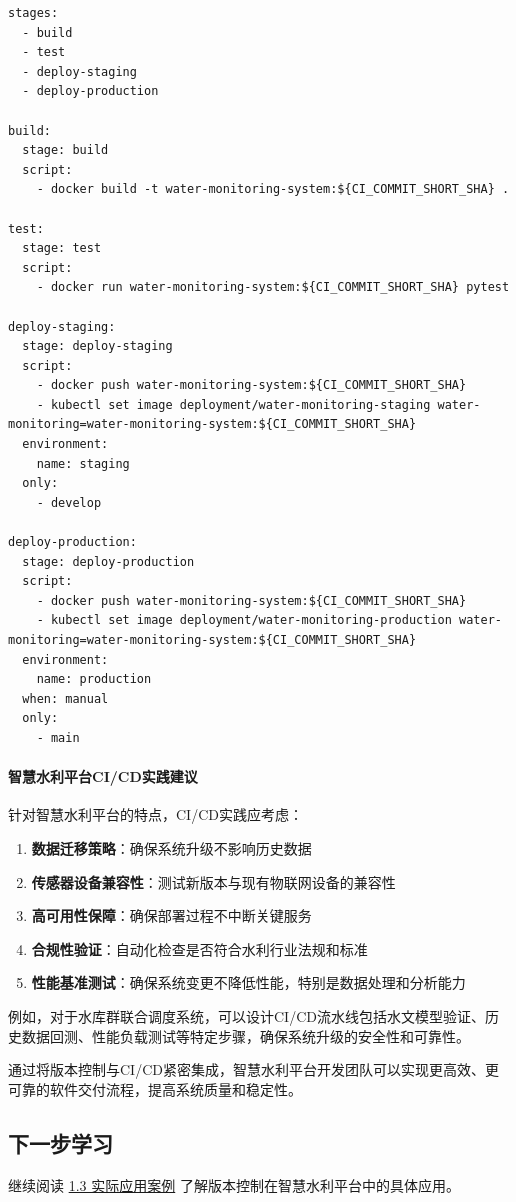 \begin{lstlisting}
stages:
  - build
  - test
  - deploy-staging
  - deploy-production

build:
  stage: build
  script:
    - docker build -t water-monitoring-system:${CI_COMMIT_SHORT_SHA} .

test:
  stage: test
  script:
    - docker run water-monitoring-system:${CI_COMMIT_SHORT_SHA} pytest

deploy-staging:
  stage: deploy-staging
  script:
    - docker push water-monitoring-system:${CI_COMMIT_SHORT_SHA}
    - kubectl set image deployment/water-monitoring-staging water-monitoring=water-monitoring-system:${CI_COMMIT_SHORT_SHA}
  environment:
    name: staging
  only:
    - develop

deploy-production:
  stage: deploy-production
  script:
    - docker push water-monitoring-system:${CI_COMMIT_SHORT_SHA}
    - kubectl set image deployment/water-monitoring-production water-monitoring=water-monitoring-system:${CI_COMMIT_SHORT_SHA}
  environment:
    name: production
  when: manual
  only:
    - main
\end{lstlisting}

\paragraph{智慧水利平台CI/CD实践建议}\label{ux667aux6167ux6c34ux5229ux5e73ux53f0cicdux5b9eux8df5ux5efaux8bae}

针对智慧水利平台的特点，CI/CD实践应考虑：

\begin{enumerate}
\def\labelenumi{\arabic{enumi}.}
\tightlist
\item
  \textbf{数据迁移策略}：确保系统升级不影响历史数据
\item
  \textbf{传感器设备兼容性}：测试新版本与现有物联网设备的兼容性
\item
  \textbf{高可用性保障}：确保部署过程不中断关键服务
\item
  \textbf{合规性验证}：自动化检查是否符合水利行业法规和标准
\item
  \textbf{性能基准测试}：确保系统变更不降低性能，特别是数据处理和分析能力
\end{enumerate}

例如，对于水库群联合调度系统，可以设计CI/CD流水线包括水文模型验证、历史数据回测、性能负载测试等特定步骤，确保系统升级的安全性和可靠性。

通过将版本控制与CI/CD紧密集成，智慧水利平台开发团队可以实现更高效、更可靠的软件交付流程，提高系统质量和稳定性。

\subsection{下一步学习}\label{ux4e0bux4e00ux6b65ux5b66ux4e60}

继续阅读 \href{section03-01-03.md}{1.3 实际应用案例}
了解版本控制在智慧水利平台中的具体应用。

